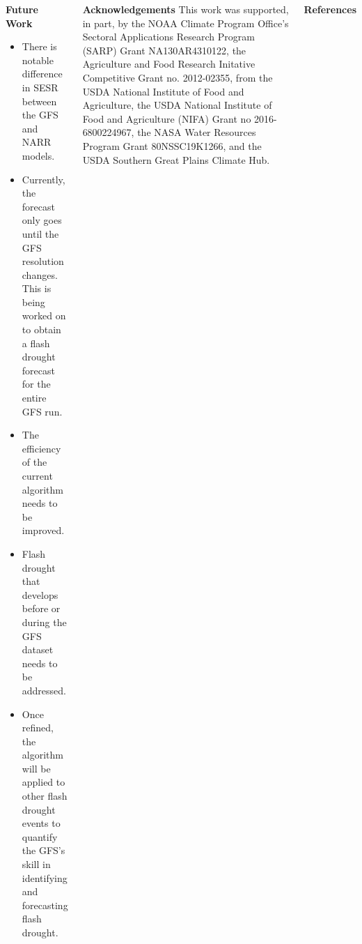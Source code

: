\documentclass{beamer}
\begin{document}
\begin{frame}[t]{}
\begin{columns}[t]
			\begin{creambox}
					\begin{columns}[t]
						\vspace*{-0.5cm} %
						\begin{block}{\bfseries Future Work}
							\begin{itemize}
								\item There is notable difference in SESR between the GFS and NARR models. 
								\item Currently, the forecast only goes until the GFS resolution changes. This is being worked on to obtain a flash drought forecast for the entire GFS run.
								\item The efficiency of the current algorithm needs to be improved.
								\item Flash drought that develops before or during the GFS dataset needs to be addressed.
								\item Once refined, the algorithm will be applied to other flash drought events to quantify the GFS's skill in identifying and forecasting flash drought.
							\end{itemize}
						\end{block}
					
						\vspace*{-1.0cm}
						\begin{block}{\bfseries\small Acknowledgements}
							\vspace*{-0.5cm}
							\justify
							This work was supported, in part, by the NOAA Climate Program Office's Sectoral Applications Research Program (SARP) Grant NA130AR4310122,
							the Agriculture and Food Research Initative Competitive Grant no. 2012-02355, from the USDA National Institute of Food and Agriculture,
							the USDA National Institute of Food and Agriculture (NIFA) Grant no 2016-6800224967, 
							the NASA Water Resources Program Grant 80NSSC19K1266, 
							and the USDA Southern Great Plains Climate Hub.
						\end{block}
						
						\vspace*{-1.0cm} %
						\begin{block}{\bfseries\small References}
							{\tiny
							  
							  
						   	  \nocite{Otkin_2018, Christian_2019, Basara_2019}}
						\end{block}
					\end{columns}
			\end{creambox}
		
		\end{columns}	
		
	\end{frame}
\end{document}
